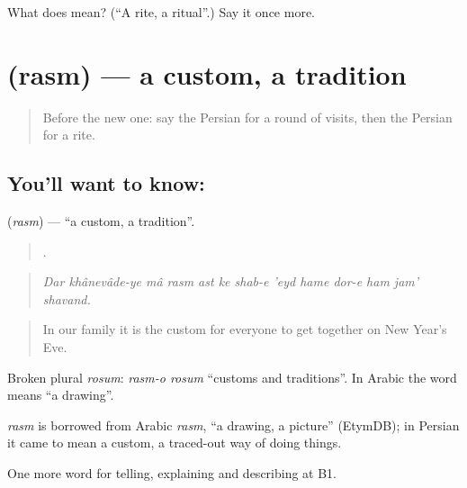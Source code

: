 \begin{tcolorbox}[breakable,colback=teal!4,colframe=teal!35!black,title={Before you move on}]
What does  mean? (\textquotedblleft{}A rite, a ritual\textquotedblright{}.) Say it once more.
\end{tcolorbox}
\section[\texorpdfstring{\fa{رسم} (rasm)}{رسم (rasm)}]{ (rasm) — a custom, a tradition}

\label{lesson:FA-C340-rasm}



\begin{quote}
Before the new one: say the Persian for a round of visits, then the Persian for a rite.
\end{quote}

\subsection*{You'll want to know: }
\textbf{} (\emph{rasm}) — \textquotedblleft{}a custom, a tradition\textquotedblright{}.

\begin{quote}
            .
\end{quote}

\begin{quote}
\emph{Dar khânevâde-ye mâ rasm ast ke shab-e 'eyd hame dor-e ham jam' shavand.}
\end{quote}

\begin{quote}
In our family it is the custom for everyone to get together on New Year's Eve.
\end{quote}

Broken plural \emph{rosum}: \emph{rasm-o rosum} \textquotedblleft{}customs and traditions\textquotedblright{}. In Arabic the word means \textquotedblleft{}a drawing\textquotedblright{}.

\begin{cousinweb}
\emph{rasm} is borrowed from Arabic \emph{rasm}, \textquotedblleft{}a drawing, a picture\textquotedblright{} (EtymDB); in Persian it came to mean a custom, a traced-out way of doing things.
\end{cousinweb}

\begin{grammarlens}[title={What you've built}]
One more word for telling, explaining and describing at B1.
\end{grammarlens}

